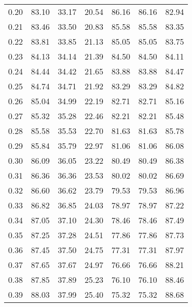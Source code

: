 \begin{tabular}{|c|c|c|c|c|c|c|}
      0.20 &     83.10 &     33.17 &      20.54 &   86.16 &      86.16 &         82.94 \\
      0.21 &     83.46 &     33.50 &      20.83 &   85.58 &      85.58 &         83.35 \\
      0.22 &     83.81 &     33.85 &      21.13 &   85.05 &      85.05 &         83.75 \\
      0.23 &     84.13 &     34.14 &      21.39 &   84.50 &      84.50 &         84.11 \\
      0.24 &     84.44 &     34.42 &      21.65 &   83.88 &      83.88 &         84.47 \\
      0.25 &     84.74 &     34.71 &      21.92 &   83.29 &      83.29 &         84.82 \\
      0.26 &     85.04 &     34.99 &      22.19 &   82.71 &      82.71 &         85.16 \\
      0.27 &     85.32 &     35.28 &      22.46 &   82.21 &      82.21 &         85.48 \\
      0.28 &     85.58 &     35.53 &      22.70 &   81.63 &      81.63 &         85.78 \\
      0.29 &     85.84 &     35.79 &      22.97 &   81.06 &      81.06 &         86.08 \\
      0.30 &     86.09 &     36.05 &      23.22 &   80.49 &      80.49 &         86.38 \\
      0.31 &     86.36 &     36.36 &      23.53 &   80.02 &      80.02 &         86.69 \\
      0.32 &     86.60 &     36.62 &      23.79 &   79.53 &      79.53 &         86.96 \\
      0.33 &     86.82 &     36.85 &      24.03 &   78.97 &      78.97 &         87.22 \\
      0.34 &     87.05 &     37.10 &      24.30 &   78.46 &      78.46 &         87.49 \\
      0.35 &     87.25 &     37.28 &      24.51 &   77.86 &      77.86 &         87.73 \\
      0.36 &     87.45 &     37.50 &      24.75 &   77.31 &      77.31 &         87.97 \\
      0.37 &     87.65 &     37.67 &      24.97 &   76.66 &      76.66 &         88.21 \\
      0.38 &     87.85 &     37.89 &      25.23 &   76.10 &      76.10 &         88.46 \\
      0.39 &     88.03 &     37.99 &      25.40 &   75.32 &      75.32 &         88.68 \\

\end{tabular}
